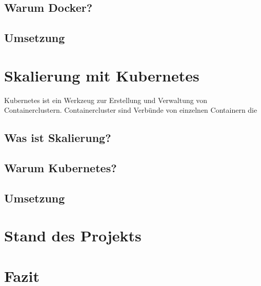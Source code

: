 \documentclass[12pt,a4paper]{article}
\begin{document}
\subsection{Warum Docker?}

\subsection{Umsetzung}

\section{Skalierung mit \gls{Kubernetes}} \label{kubernetes}
Kubernetes ist ein Werkzeug zur Erstellung und Verwaltung von Containerclustern. Containercluster sind Verbünde von einzelnen Containern die 

\subsection{Was ist Skalierung?}

\subsection{Warum \gls{Kubernetes}?} 

\subsection{Umsetzung}

\section{Stand des Projekts} \label{project_status}

\section{Fazit}\label{conclusion}

\newpage


\printbibliography
\newpage
\printglossary
\newpage
\listoffigures
\end{document}
